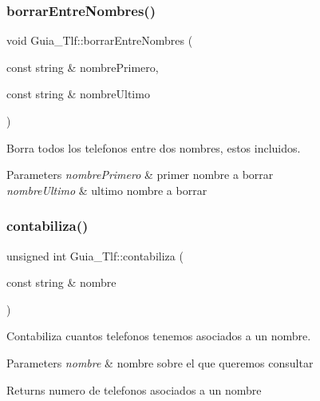 \subsubsection{\texorpdfstring{borrar\+Entre\+Nombres()}{borrarEntreNombres()}}
{\footnotesize\ttfamily void Guia\+\_\+\+Tlf\+::borrar\+Entre\+Nombres (\begin{DoxyParamCaption}\item[{const string \&}]{nombre\+Primero,  }\item[{const string \&}]{nombre\+Ultimo }\end{DoxyParamCaption})}



Borra todos los telefonos entre dos nombres, estos incluidos. 


\begin{DoxyParams}{Parameters}
{\em nombre\+Primero} & primer nombre a borrar \\
\hline
{\em nombre\+Ultimo} & ultimo nombre a borrar \\
\hline
\end{DoxyParams}
\mbox{\label{classGuia__Tlf_aa63213524c6339ea89baae2b5d2ebb69}} 
\subsubsection{\texorpdfstring{contabiliza()}{contabiliza()}}
{\footnotesize\ttfamily unsigned int Guia\+\_\+\+Tlf\+::contabiliza (\begin{DoxyParamCaption}\item[{const string \&}]{nombre }\end{DoxyParamCaption})}



Contabiliza cuantos telefonos tenemos asociados a un nombre. 


\begin{DoxyParams}{Parameters}
{\em nombre} & nombre sobre el que queremos consultar \\
\hline
\end{DoxyParams}
\begin{DoxyReturn}{Returns}
numero de telefonos asociados a un nombre 
\end{DoxyReturn}
\mbox{\label{classGuia__Tlf_ab3fc64c51278c56f2d610f2eab00bf49}} 
